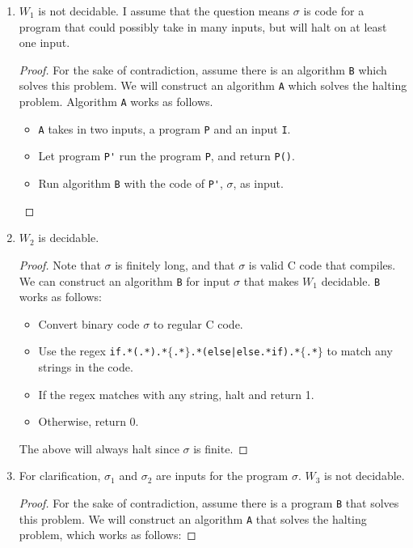 \documentclass[12pt]{article}
\newcommand{\code}{\lstinline}
\begin{document}
    \begin{enumerate}
        \item $W_1$ is not decidable. I assume that the question means $\sigma$ is code for a program that could possibly take in many inputs, but will halt on at least one input.
        \begin{proof}
            For the sake of contradiction, assume there is an algorithm \code{B} which solves this problem. We will construct an algorithm \code{A} which solves the halting problem. Algorithm \code{A} works as follows.
            \begin{itemize}
                \item \code{A} takes in two inputs, a program \code{P} and an input \code{I}.
                \item Let program \code{P'} run the program \code{P}, and return \code{P()}.
                \item Run algorithm \code{B} with the code of \code{P'}, $\sigma$, as input.
            \end{itemize}
        \end{proof}
        \item $W_2$ is decidable. 
        \begin{proof}
            Note that $\sigma$ is finitely long, and that $\sigma$ is valid C code that compiles. We can construct an algorithm \code{B} for input $\sigma$ that makes $W_1$ decidable. \code{B} works as follows:
            \begin{itemize}
                \item Convert binary code $\sigma$ to regular C code.
                \item Use the regex \code{if.*(.*).*}$\{$\code{.*}$\}$\code{.*(else|else.*if).*}$\{$\code{.*}$\}$ to match any strings in the code.
                \item If the regex matches with any string, halt and return 1.
                \item Otherwise, return 0.
            \end{itemize}
            The above will always halt since $\sigma$ is finite.
        \end{proof}
        \item For clarification, $\sigma_1$ and $\sigma_2$ are inputs for the program $\sigma$. $W_3$ is not decidable.
        \begin{proof}
            For the sake of contradiction, assume there is a program \code{B} that solves this problem. We will construct an algorithm \code{A} that solves the halting problem, which works as follows:

\end{proof}
\end{enumerate}
\end{document}
